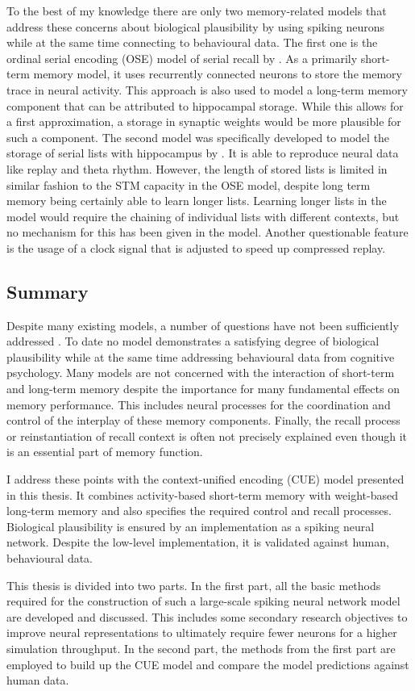 To the best of my knowledge there are only two memory-related models that address these concerns about biological plausibility by using spiking neurons while at the same time connecting to behavioural data.
The first one is the ordinal serial encoding (OSE) model of serial recall by \textcite{Choo2010}.
As a primarily short-term memory model, it uses recurrently connected neurons to store the memory trace in neural activity.
This approach is also used to model a long-term memory component that can be attributed to hippocampal storage.
While this allows for a first approximation, a storage in synaptic weights would be more plausible for such a component.
The second model was specifically developed to model the storage of serial lists with hippocampus by \textcite{OliverTrujillo2014}.
It is able to reproduce neural data like replay and theta rhythm.
However, the length of stored lists is limited in similar fashion to the STM capacity in the OSE model, despite long term memory being certainly able to learn longer lists.
Learning longer lists in the model would require the chaining of individual lists with different contexts, but no mechanism for this has been given in the model.
Another questionable feature is the usage of a clock signal that is adjusted to speed up compressed replay.


\subsection{Summary}
Despite many existing models, a number of questions have not been sufficiently addressed \parencite[cp.][]{horwitz2008}.
To date no model demonstrates a satisfying degree of biological plausibility while at the same time addressing behavioural data from cognitive psychology.
Many models are not concerned with the interaction of short-term and long-term memory despite the importance for many fundamental effects on memory performance.
This includes neural processes for the coordination and control of the interplay of these memory components.
Finally, the recall process or reinstantiation of recall context is often not precisely explained even though it is an essential part of memory function.

I address these points with the context-unified encoding (CUE) model presented in this thesis.
It combines activity-based short-term memory with weight-based long-term memory and also specifies the required control and recall processes.
Biological plausibility is ensured by an implementation as a spiking neural network.
Despite the low-level implementation, it is validated against human, behavioural data.

This thesis is divided into two parts.
In the first part, all the basic methods required for the construction of such a large-scale spiking neural network model are developed and discussed.
This includes some secondary research objectives to improve neural representations to ultimately require fewer neurons for a higher simulation throughput.
In the second part, the methods from the first part are employed to build up the CUE model and compare the model predictions against human data.
